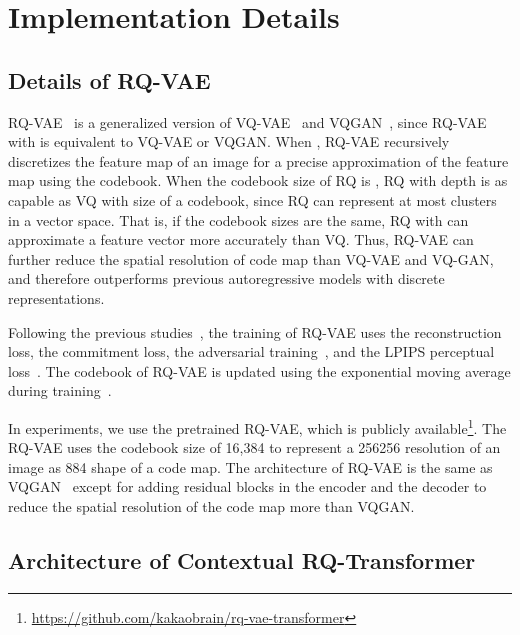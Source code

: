 \documentclass{article}
\begin{document}



\clearpage
\appendix



\section{Implementation Details}

\subsection{Details of RQ-VAE}

RQ-VAE~\cite{RQVAE} is a generalized version of VQ-VAE~\cite{VQVAE} and VQGAN~\cite{VQGAN}, since RQ-VAE with  is equivalent to VQ-VAE or VQGAN.
When , RQ-VAE recursively discretizes the feature map of an image for a precise approximation of the feature map using the codebook.
When the codebook size of RQ is , RQ with depth  is as capable as VQ with  size of a codebook, since RQ can represent at most  clusters in a vector space.
That is, if the codebook sizes are the same, RQ with  can approximate a feature vector more accurately than VQ.
Thus, RQ-VAE can further reduce the spatial resolution of code map than VQ-VAE and VQ-GAN, and therefore outperforms previous autoregressive models with discrete representations.

Following the previous studies~\cite{VQGAN,RQVAE,VQVAE}, the training of RQ-VAE uses the reconstruction loss, the commitment loss, the adversarial training~\cite{isola2017image}, and the LPIPS perceptual loss~\cite{johnson2016perceptual}.
The codebook  of RQ-VAE is updated using the exponential moving average during training~\cite{RQVAE,VQVAE}.

In experiments, we use the pretrained RQ-VAE, which is publicly available\footnote{\url{https://github.com/kakaobrain/rq-vae-transformer}}.
The RQ-VAE uses the codebook size of 16,384 to represent a 256256 resolution of an image as 884 shape of a code map.
The architecture of RQ-VAE is the same as VQGAN~\cite{VQGAN} except for adding residual blocks in the encoder and the decoder to reduce the spatial resolution of the code map more than VQGAN.

\subsection{Architecture of Contextual RQ-Transformer}
\end{document}
